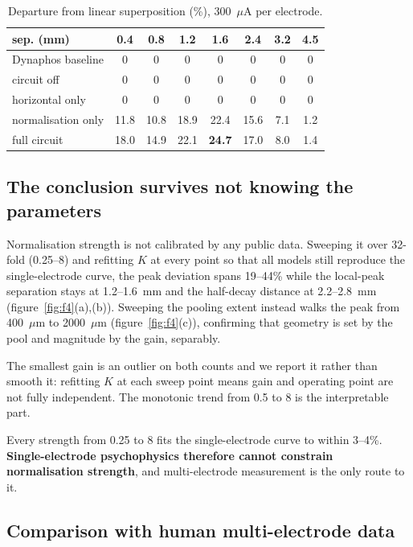 \documentclass[10pt,twocolumn]{article}
\newcommand{\um}{\ensuremath{\mu\text{m}}}
\newcommand{\uA}{\ensuremath{\mu\text{A}}}
\begin{document}
\begin{table}[t]
\centering
\caption{Departure from linear superposition (\%), 300~\uA{} per electrode.}
\label{tab:t1}
\small
\setlength{\tabcolsep}{3.2pt}
\begin{tabular}{lccccccc}
\toprule
sep. (mm) & 0.4 & 0.8 & 1.2 & 1.6 & 2.4 & 3.2 & 4.5 \\
\midrule
Dynaphos baseline    & 0 & 0 & 0 & 0 & 0 & 0 & 0 \\
circuit off          & 0 & 0 & 0 & 0 & 0 & 0 & 0 \\
horizontal only      & 0 & 0 & 0 & 0 & 0 & 0 & 0 \\
normalisation only   & 11.8 & 10.8 & 18.9 & 22.4 & 15.6 & 7.1 & 1.2 \\
full circuit         & 18.0 & 14.9 & 22.1 & \textbf{24.7} & 17.0 & 8.0 & 1.4 \\
\bottomrule
\end{tabular}
\end{table}

\subsection{The conclusion survives not knowing the parameters}

Normalisation strength is not calibrated by any public data. Sweeping it
over 32-fold (0.25--8) and refitting $K$ at every point so that all models
still reproduce the single-electrode curve, the peak deviation spans
19--44\% while the local-peak separation stays at 1.2--1.6~mm and the
half-decay distance at 2.2--2.8~mm (figure~\ref{fig:f4}(a),(b)). Sweeping
the pooling extent instead walks the peak from 400~\um{} to 2000~\um{}
(figure~\ref{fig:f4}(c)), confirming that geometry is set by the pool and
magnitude by the gain, separably.

The smallest gain is an outlier on both counts and we report it rather than
smooth it: refitting $K$ at each sweep point means gain and operating point
are not fully independent. The monotonic trend from 0.5 to 8 is the
interpretable part.

Every strength from 0.25 to 8 fits the single-electrode curve to within
3--4\%. \textbf{Single-electrode psychophysics therefore cannot constrain
normalisation strength}, and multi-electrode measurement is the only route
to it.

\subsection{Comparison with human multi-electrode data}
\end{document}
